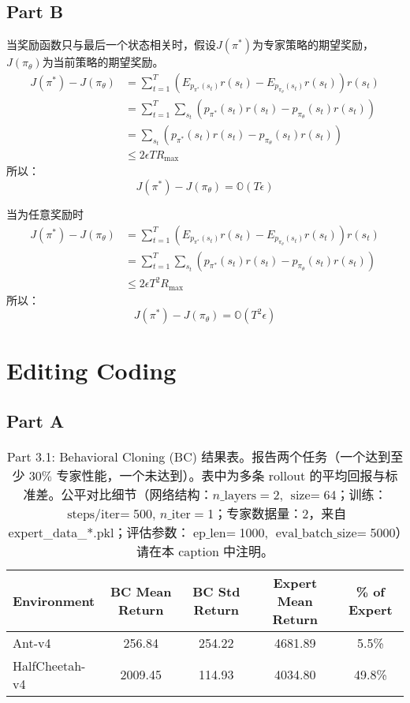 \documentclass[12pt,oneside]{book}
\begin{document}
\subsection{Part B}
当奖励函数只与最后一个状态相关时，假设$J(\pi^*)$为专家策略的期望奖励，$J(\pi_{\theta})$为当前策略的期望奖励。
\begin{align}
    {J}(\pi^*) - {J}(\pi_{\theta}) 
    &= \sum_{t=1}^{T} (E_{p_{\pi^*}(s_t)}r(s_t) - E_{p_{\pi_{\theta}}(s_t)}r(s_t)) r(s_t)\nonumber \\
    &= \sum_{t=1}^{T} \sum_{s_t} (p_{\pi^*}(s_t)r(s_t) - p_{\pi_{\theta}}(s_t)r(s_t)) \nonumber \\
    &= \sum_{s_t} (p_{\pi^*}(s_t)r(s_t) - p_{\pi_{\theta}}(s_t)r(s_t)) \nonumber \\
    &\leq 2\epsilon T R_{\max}
\end{align}
所以：
\begin{equation}
    {J}(\pi^*) - {J}(\pi_{\theta}) = \mathbb{O}(T \epsilon)
\end{equation}

当为任意奖励时
\begin{align}
    {J}(\pi^*) - {J}(\pi_{\theta}) 
    &= \sum_{t=1}^{T} (E_{p_{\pi^*}(s_t)}r(s_t) - E_{p_{\pi_{\theta}}(s_t)}r(s_t)) r(s_t)\nonumber \\
    &= \sum_{t=1}^{T} \sum_{s_t} (p_{\pi^*}(s_t)r(s_t) - p_{\pi_{\theta}}(s_t)r(s_t)) \nonumber \\
    &\leq 2\epsilon T^2 R_{\max}
\end{align}
所以：
\begin{equation}
    {J}(\pi^*) - {J}(\pi_{\theta}) = \mathbb{O}(T^2 \epsilon)
\end{equation}

\section{Editing Coding}

\subsection{Part A}
\begin{table}[h!]
    \centering
    \caption{Part 3.1: Behavioral Cloning (BC) 结果表。报告两个任务（一个达到至少 \(30\%\) 专家性能，一个未达到）。表中为多条 rollout 的平均回报与标准差。公平对比细节（网络结构：\(n\_\text{layers}=\)2, \(\text{size}=\)64；训练：\(\text{steps/iter}=\)500, \(n\_\text{iter}=\)1；专家数据量：2，来自expert\_data\_*.pkl；评估参数：\(\text{ep\_len}=\)1000, \(\text{eval\_batch\_size}=\)5000）请在本 caption 中注明。}
    \label{tab:bc_part3_1}
    \vspace{0.5em}
    \begin{tabular}{lcccc}
    \hline
    Environment & BC Mean Return & BC Std Return & Expert Mean Return & \% of Expert \\
    \hline
    Ant-v4 & 256.84 & 254.22 & 4681.89 & 5.5\% \\
    HalfCheetah-v4 & 2009.45 & 114.93 & 4034.80 & 49.8\% \\
    \hline
    \end{tabular}
\end{table}
    
\end{document}
